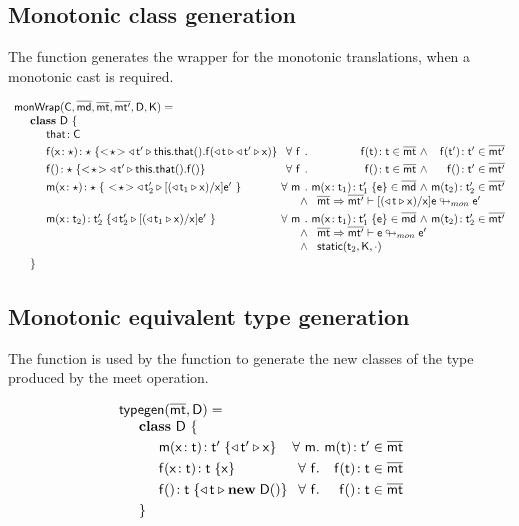\documentclass[a4paper,USenglish]{tex/lipics-v2016}
\begin{document}
\subsection{Monotonic class generation}\label{classgen}

The  function generates the wrapper for the monotonic translations,
when a monotonic cast is required.

\footnotesize
\[\begin{array}{l@{~}r@{}r@{~}r@{~}r@{~}rr}
\arrayrulecolor{white}
\classgen{\C, \b\md, \bmt, \bmtp, \D, \K}= \\
\SP \class~\D~\{ \\
\SPP \Fdef\that\C
\\[1mm]
\SPP \Mdef\f\x\any\any {\SubCast\any{\MonCast\tp{
      \Set{\Get\this\that}\f{\MonCast\t{\MonCast\tp\x}}}}}
&
\All f \Mtype\f\t\t\in\bmt &\wedge& \Mtype\f\tp\tp\in\bmtp
\\[1mm]\hline
\SPP \Mdefz\f\any{\SubCast\any{\MonCast\tp{\Get{\Get\this\that}\f}}}
&
 \All f \Mtype\f{}\t \in \bmt &\wedge& \Mtype\f{}\tp \in \bmtp
\\[1mm]\hline
\SPP \Mdef\m\x\any\any {~\SubCast\any{\MonCast{\tp[2]}{{[{(\MonCast{\t[1]}\x)}/\x]\ep}}}~}
&     \All \m \Mdef\m\x{\t[1]}{\tp[1]}\e\in\b\md &\wedge& \Mtype\m{\t[2]}{\tp[2]}\in\bmtp \\
&&\wedge&\multicolumn{3}{l}{\rtranstz{\bmt}\bmtp{[{(\MonCast\t\x)}/\x]\e}{\ep}}
\\[1mm]\hline
\SPP \Mdef\m\x{\t[2]}{\tp[2]} {\MonCast{\tp[2]}{[{(\MonCast{\t[1]}\x)}/\x]\ep}~}
&     \All \m \Mdef\m\x{\t[1]}{\tp[1]}\e\in\b\md &\wedge& \Mtype\m{\t[2]}{\tp[2]}\in\bmtp \\
&&\wedge&\multicolumn{3}{l}{\rtranstz{\bmt}\bmtp{\e}{\ep}} \\
&&\wedge&\multicolumn{3}{l}{\statictype{\t[2]}{\K}{\cdot}}
\\[1mm]\hline
\SP\}
\end{array}
\]
\normalsize





\subsection{Monotonic equivalent type generation}\label{typegen}

The  function is used by the  function to generate the new classes
of the type produced by the meet operation.

\footnotesize
\[\begin{array}{l@{~}r@{}r@{~}r@{~}r@{~}rr}
\arrayrulecolor{white}
\typegen{\bmt}{\D} = \\
\SP \class~\D~\{
\\[1mm]
\SPP \Mdef\m\x\t\tp {{\MonCast\tp{\x}}} 
&
\All m \Mtype\m\t\tp\in\bmt
\\[1mm]\hline
\SPP \Mdef\f\x\t\t {\x}
&
\All f \Mtype\f\t\t\in\bmt
\\[1mm]\hline
\SPP \Mdefz\f\t{{\MonCast\t{\New\D{}}}}
&
 \All f \Mtype\f{}\t \in \bmt
\\[1mm]
\SP\}
\end{array}
\]
\normalsize
\end{document}
